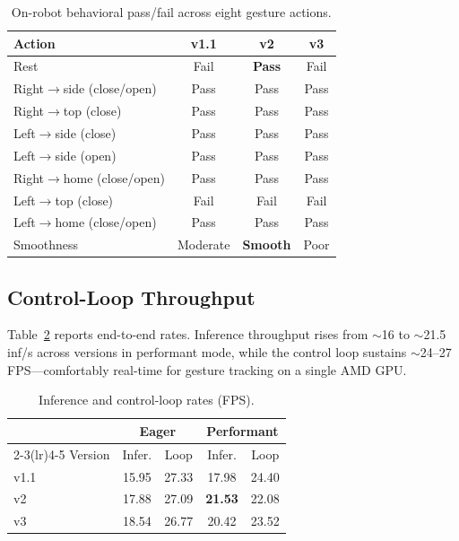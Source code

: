 \documentclass[blind]{gtac}
\begin{document}
\begin{table}[H]
\centering
\caption{On-robot behavioral pass/fail across eight gesture actions.}
\label{tab:behavior}
\footnotesize
\begin{tabular}{@{}lccc@{}}
\toprule
Action & v1.1 & v2 & v3 \\
\midrule
Rest & Fail & \textbf{Pass} & Fail \\
Right$\to$side (close/open) & Pass & Pass & Pass \\
Right$\to$top (close) & Pass & Pass & Pass \\
Left$\to$side (close) & Pass & Pass & Pass \\
Left$\to$side (open) & Pass & Pass & Pass \\
Right$\to$home (close/open) & Pass & Pass & Pass \\
Left$\to$top (close) & Fail & Fail & Fail \\
Left$\to$home (close/open) & Pass & Pass & Pass \\
\midrule
Smoothness & Moderate & \textbf{Smooth} & Poor \\
\bottomrule
\end{tabular}
\end{table}

\subsection{Control-Loop Throughput}

Table~\ref{tab:fps} reports end-to-end rates. Inference throughput rises from
$\sim$16 to $\sim$21.5 inf/s across versions in performant mode, while the
control loop sustains $\sim$24--27\,FPS---comfortably real-time for gesture
tracking on a single AMD GPU.

\begin{table}[H]
\centering
\caption{Inference and control-loop rates (FPS).}
\label{tab:fps}
\footnotesize
\begin{tabular}{@{}lcccc@{}}
\toprule
 & \multicolumn{2}{c}{Eager} & \multicolumn{2}{c}{Performant} \\
\cmidrule(lr){2-3}\cmidrule(lr){4-5}
Version & Infer. & Loop & Infer. & Loop \\
\midrule
v1.1 & 15.95 & 27.33 & 17.98 & 24.40 \\
v2   & 17.88 & 27.09 & \textbf{21.53} & 22.08 \\
v3   & 18.54 & 26.77 & 20.42 & 23.52 \\
\bottomrule
\end{tabular}
\end{table}
\end{document}
